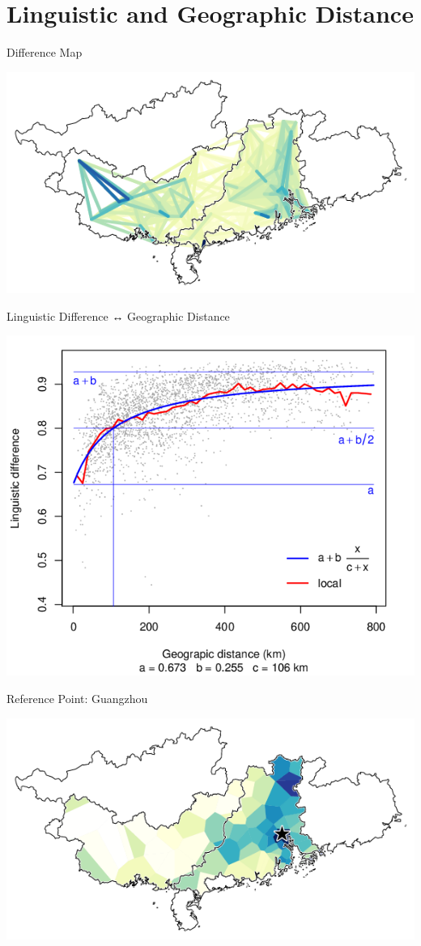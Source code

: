 \documentclass[presentation]{beamer}
\begin{document}
\section{Linguistic and Geographic Distance}
\label{sec:orgdaf5864}
\begin{frame}[label={sec:org62afada}]{Difference Map}
\begin{center}
\includegraphics[width=.9\linewidth]{diff.png}
\end{center}
\end{frame}
\begin{frame}[label={sec:org62a31a2}]{Linguistic Difference ↔ Geographic Distance}
\begin{center}
\includegraphics[width=.9\linewidth]{plot01.png}
\end{center}
\end{frame}
\begin{frame}[label={sec:orgb6f69b3}]{Reference Point: Guangzhou}
\begin{center}
\includegraphics[width=.9\linewidth]{curmap_gz.png}
\end{center}
\end{frame}
\end{document}
